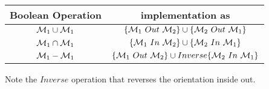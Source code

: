 \bigskip 
\begin{center}
\begin{tabular}{||c|c||} \hline
Boolean Operation & implementation as \\ \hline \hline
${\cal M}_1 \cup {\cal M}_1$ & $\{ {\cal M}_1\ Out\ {\cal M}_2 \} \cup
			     \{ {\cal M}_2\ Out\ {\cal M}_1 \}$ \\
${\cal M}_1 \cap {\cal M}_1$ & $\{ {\cal M}_1\ In\ {\cal M}_2 \} \cup
			     \{ {\cal M}_2\ In\ {\cal M}_1 \}$ \\
${\cal M}_1 - {\cal M}_1$ & $\{ {\cal M}_1\ Out\ {\cal M}_2 \} \cup
			     Inverse\{ {\cal M}_2\ In\ {\cal M}_1 \}$ \\ \hline
\end{tabular}
\end{center}
\bigskip 

Note the $Inverse$ operation that reverses the orientation inside
out.

